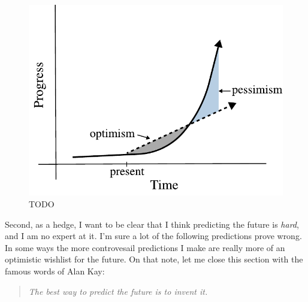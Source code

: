 \begin{figure}
    \centering
    \includegraphics[width=\linewidth]{figures/exponential_growth}
    \caption{TODO}
    \label{fig:exponential_growth}
\end{figure}

Second, as a hedge, I want to be clear that I think predicting the future is
\emph{hard}, and I am no expert at it. I'm sure a lot of the following
predictions prove wrong. In some ways the more controvesail predictions I make
are really more of an optimistic wishlist for the future. On that note, let me
close this section with the famous words of Alan Kay:
\begin{quote}
    \emph{The best way to predict the future is to invent it.}
\end{quote}

